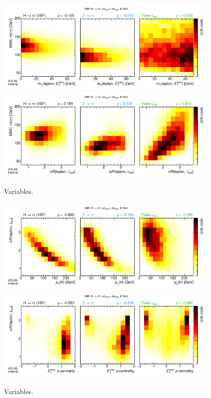 
\clearpage
\begin{figure}[tp]
  \centering
  \includegraphics[width=0.98\textwidth]{figures/kinematiccorrelations/mT-vs-mMMC}
  \includegraphics[width=0.98\textwidth]{figures/kinematiccorrelations/taulep_dR-vs-mMMC}
  \caption{Variables.}
  \label{fig:strategy-kinematic-correlations-1}
\end{figure}

\begin{figure}[tp]
  \centering
  \includegraphics[width=0.98\textwidth]{figures/kinematiccorrelations/H_pt-vs-taulep_dR}
  \includegraphics[width=0.98\textwidth]{figures/kinematiccorrelations/met_phi_cent-vs-taulep_dR}
  \caption{Variables.}
  \label{fig:strategy-kinematic-correlations-2}
\end{figure}

